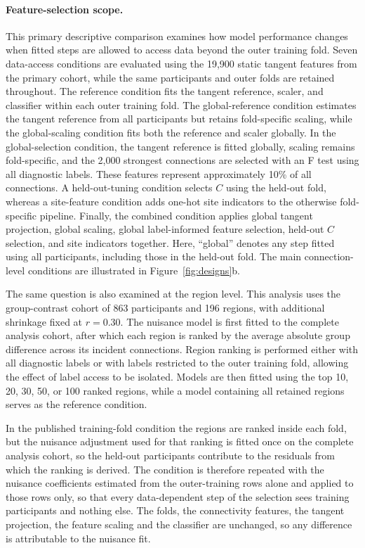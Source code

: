 \paragraph{\textbf{Feature-selection scope.}}
\label{par:selection-scope}
This primary descriptive comparison examines how model performance changes when fitted steps are allowed to access data beyond the outer training fold. Seven data-access conditions are evaluated using the 19,900 static tangent features from the primary cohort, while the same participants and outer folds are retained throughout. The reference condition fits the tangent reference, scaler, and classifier within each outer training fold. The global-reference condition estimates the tangent reference from all participants but retains fold-specific scaling, while the global-scaling condition fits both the reference and scaler globally. In the global-selection condition, the tangent reference is fitted globally, scaling remains fold-specific, and the 2,000 strongest connections are selected with an F test using all diagnostic labels. These features represent approximately 10\% of all connections. A held-out-tuning condition selects $C$ using the held-out fold, whereas a site-feature condition adds one-hot site indicators to the otherwise fold-specific pipeline. Finally, the combined condition applies global tangent projection, global scaling, global label-informed feature selection, held-out $C$ selection, and site indicators together. Here, ``global'' denotes any step fitted using all participants, including those in the held-out fold. The main connection-level conditions are illustrated in Figure~\ref{fig:designs}b.

The same question is also examined at the region level. This analysis uses the group-contrast cohort of 863 participants and 196 regions, with additional shrinkage fixed at $r=0.30$. The nuisance model is first fitted to the complete analysis cohort, after which each region is ranked by the average absolute group difference across its incident connections. Region ranking is performed either with all diagnostic labels or with labels restricted to the outer training fold, allowing the effect of label access to be isolated. Models are then fitted using the top 10, 20, 30, 50, or 100 ranked regions, while a model containing all retained regions serves as the reference condition.

In the published training-fold condition the regions are ranked inside each fold, but the nuisance adjustment used for that ranking is fitted once on the complete analysis cohort, so the held-out participants contribute to the residuals from which the ranking is derived. The condition is therefore repeated with the nuisance coefficients estimated from the outer-training rows alone and applied to those rows only, so that every data-dependent step of the selection sees training participants and nothing else. The folds, the connectivity features, the tangent projection, the feature scaling and the classifier are unchanged, so any difference is attributable to the nuisance fit.

